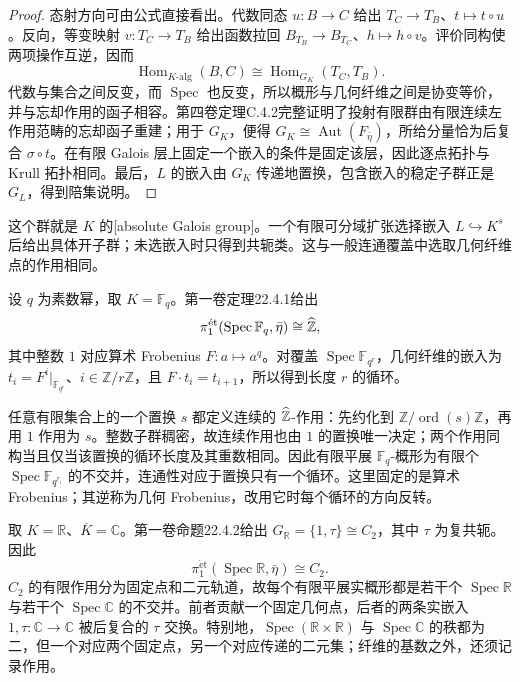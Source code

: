 \begin{proof}
	态射方向可由公式直接看出。代数同态 \(u:B\rightarrow C\) 给出 \(T_C\rightarrow T_B\)、\(t\mapsto t\circ u\)。反向，等变映射 \(v:T_C\rightarrow T_B\) 给出函数拉回 \(B_{T_B}\rightarrow B_{T_C}\)、\(h\mapsto h\circ v\)。评价同构使两项操作互逆，因而
	\[
		\operatorname{Hom}_{K\text{-}\mathrm{alg}}(B,C)
		\cong\operatorname{Hom}_{G_K}(T_C,T_B).
	\]
	代数与集合之间反变，而 \(\operatorname{Spec}\) 也反变，所以概形与几何纤维之间是协变等价，并与忘却作用的函子相容。第四卷定理C.4.2完整证明了投射有限群由有限连续左作用范畴的忘却函子重建；用于 \(G_K\)，便得 \(G_K\cong\operatorname{Aut}(F_{\bar\eta})\)，所给分量恰为后复合 \(\sigma\circ t\)。在有限 Galois 层上固定一个嵌入的条件是固定该层，因此逐点拓扑与 Krull 拓扑相同。最后，\(L\) 的嵌入由 \(G_K\) 传递地置换，包含嵌入的稳定子群正是 \(G_L\)，得到陪集说明。
\end{proof}

这个群就是 \(K\) 的[absolute Galois group]。一个有限可分域扩张选择嵌入 \(L\hookrightarrow K^s\) 后给出具体开子群；未选嵌入时只得到共轭类。这与一般连通覆盖中选取几何纤维点的作用相同。

\begin{example}[有限域上的覆盖]\label{b3:exm:I-finite-field-covers}
	设 \(q\) 为素数幂，取 \(K=\mathbb F_q\)。第一卷定理22.4.1给出
	\[
		\pi_1^{\mathrm{\acute et}}(\operatorname{Spec}\mathbb F_q,\bar\eta)
		\cong\widehat{\vphantom{Z}\mathbb Z},
	\]
	其中整数 \(1\) 对应算术 Frobenius \(F:a\mapsto a^q\)。对覆盖 \(\operatorname{Spec}\mathbb F_{q^r}\)，几何纤维的嵌入为 \(t_i=F^i|_{\mathbb F_{q^r}}\)、\(i\in\mathbb Z/r\mathbb Z\)，且 \(F\cdot t_i=t_{i+1}\)，所以得到长度 \(r\) 的循环。

	\ProseParagraphBreak
	任意有限集合上的一个置换 \(s\) 都定义连续的 \(\widehat{\vphantom{Z}\mathbb Z}\)-作用：先约化到 \(\mathbb Z/\operatorname{ord}(s)\mathbb Z\)，再用 \(1\) 作用为 \(s\)。整数子群稠密，故连续作用也由 \(1\) 的置换唯一决定；两个作用同构当且仅当该置换的循环长度及其重数相同。因此有限平展 \(\mathbb F_q\)-概形为有限个 \(\operatorname{Spec}\mathbb F_{q^{r_i}}\) 的不交并，连通性对应于置换只有一个循环。这里固定的是算术 Frobenius；其逆称为几何 Frobenius，改用它时每个循环的方向反转。
\end{example}

\begin{example}[实数域上的覆盖]\label{b3:exm:I-real-field-covers}
	取 \(K=\mathbb R\)、\(\overline K=\mathbb C\)。第一卷命题22.4.2给出 \(G_{\mathbb R}=\{1,\tau\}\cong C_2\)，其中 \(\tau\) 为复共轭。因此
	\[
		\pi_1^{\mathrm{\acute et}}(\operatorname{Spec}\mathbb R,\bar\eta)\cong C_2.
	\]
	\(C_2\) 的有限作用分为固定点和二元轨道，故每个有限平展实概形都是若干个 \(\operatorname{Spec}\mathbb R\) 与若干个 \(\operatorname{Spec}\mathbb C\) 的不交并。前者贡献一个固定几何点，后者的两条实嵌入 \(1,\tau:\mathbb C\rightarrow\mathbb C\) 被后复合的 \(\tau\) 交换。特别地，\(\operatorname{Spec}(\mathbb R\times\mathbb R)\) 与 \(\operatorname{Spec}\mathbb C\) 的秩都为二，但一个对应两个固定点，另一个对应传递的二元集；纤维的基数之外，还须记录作用。
\end{example}


